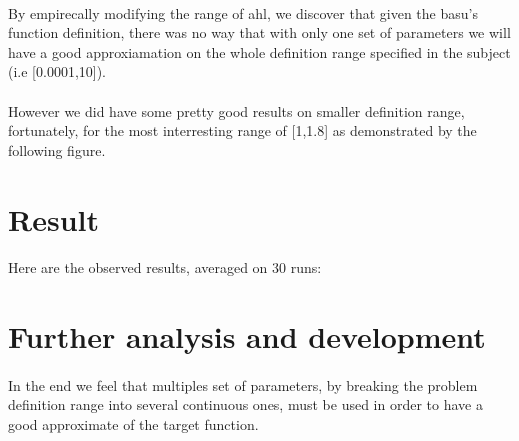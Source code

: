 \documentclass{article}
\begin{document}
    \paragraph{} %
    \label{par:}
      By empirecally modifying the range of ahl, we discover that given the basu's
      function definition, there was no way that with only one set of parameters we will
      have a good approxiamation on the whole definition range specified in the
      subject (i.e [0.0001,10]). 

    \paragraph{} %
    \label{par:}
      However we did have some pretty good results on smaller definition range,
      fortunately, for the most interresting range of [1,1.8] as demonstrated by the
      following figure.

    
   
   \section{Result} %
   \label{sec:Result}
   \paragraph{} %
   
     \label{par:}
       Here are the observed results, averaged on 30 runs:



   \section{Further analysis and development} %
   \label{sec:section name}
   \paragraph{} %
   \label{par:}
   
     In the end we feel that multiples set of parameters, by breaking the problem
     definition range into several continuous ones, must be used in order to have
     a good approximate of the target function.

  
\end{document}
